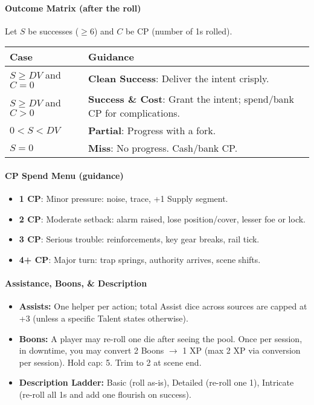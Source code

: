 \paragraph{Outcome Matrix (after the roll)}
Let $S$ be successes ($\geq 6$) and $C$ be CP (number of 1s rolled).
\begin{center}
\begin{tabular}{@{}ll@{}}
\toprule
\textbf{Case} & \textbf{Guidance} \\
\midrule
$S \geq DV$ and $C=0$ & \textbf{Clean Success}: Deliver the intent crisply. \\
$S \geq DV$ and $C>0$ & \textbf{Success \& Cost}: Grant the intent; spend/bank CP for complications. \\
$0 < S < DV$          & \textbf{Partial}: Progress with a fork. \\
$S = 0$               & \textbf{Miss}: No progress. Cash/bank CP. \\
\bottomrule
\end{tabular}
\end{center}

\paragraph{CP Spend Menu (guidance)}
\begin{itemize}
  \item \textbf{1 CP}: Minor pressure: noise, trace, +1 Supply segment.
  \item \textbf{2 CP}: Moderate setback: alarm raised, lose position/cover, lesser foe or lock.
  \item \textbf{3 CP}: Serious trouble: reinforcements, key gear breaks, rail tick.
  \item \textbf{4+ CP}: Major turn: trap springs, authority arrives, scene shifts.
\end{itemize}

\paragraph{Assistance, Boons, \& Description}
\begin{itemize}
  \item \textbf{Assists:} One helper per action; total Assist dice across sources are capped at +3 (unless a specific Talent states otherwise).
  \item \textbf{Boons:} A player may re-roll one die after seeing the pool. Once per session, in downtime, you may convert 2 Boons $\rightarrow$ 1 XP (max 2 XP via conversion per session). Hold cap: 5. Trim to 2 at scene end.
  \item \textbf{Description Ladder:} Basic (roll as-is), Detailed (re-roll one 1), Intricate (re-roll all 1s and add one flourish on success).
\end{itemize}

